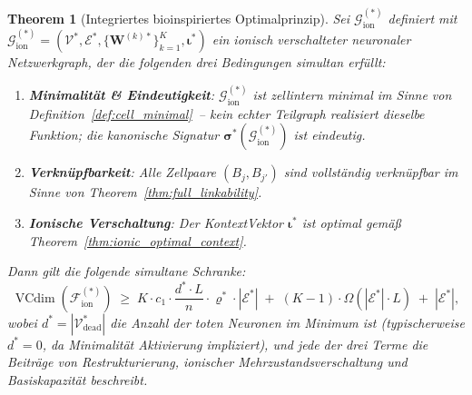 ﻿\documentclass[12pt, a4paper, openany]{report}
\newtheorem{theorem}{Theorem}[chapter]
\newcommand{\calG}{\mathcal{G}}
\newcommand{\calV}{\mathcal{V}}
\newcommand{\calE}{\mathcal{E}}
\newcommand{\calF}{\mathcal{F}}
\DeclareMathOperator{\VC}{VCdim}
\begin{document}
\begin{theorem}[Integriertes bioinspiriertes Optimalprinzip]
\label{thm:bio_master}
Sei  $\calG_{\mathrm{ion}}^{(*)}$ definiert mit $\calG_{\mathrm{ion}}^{(*)} = (\calV^*, \calE^*, \{\bm{W}^{(k)*}\}_{k=1}^K, \bm{\iota}^*)$
ein ionisch verschalteter neuronaler Netzwerkgraph, der die folgenden
drei Bedingungen simultan erfüllt:
\begin{enumerate}[label=(\Roman*)]
  \item \textbf{Minimalität \& Eindeutigkeit}: $\calG_{\mathrm{ion}}^{(*)}$ ist
    zellintern minimal im Sinne von Definition~\ref{def:cell_minimal}~--
    kein echter Teilgraph realisiert dieselbe Funktion; die kanonische
    Signatur $\bm{\sigma}^*(\calG_{\mathrm{ion}}^{(*)})$ ist eindeutig.
  \item \textbf{Verknüpfbarkeit}: Alle Zellpaare $(B_j, B_{j'})$ sind
    vollständig verknüpfbar im Sinne von Theorem~\ref{thm:full_linkability}.
  \item \textbf{Ionische Verschaltung}: Der KontextVektor $\bm{\iota}^*$ ist
    optimal gemäß Theorem~\ref{thm:ionic_optimal_context}.
\end{enumerate}
Dann gilt die folgende simultane Schranke:
\begin{equation}
  \label{eq:bio_master_eq}
  \VC(\calF_{\mathrm{ion}}^{(*)})
  \;\geq\;
  K \cdot c_1 \cdot \frac{d^* \cdot L}{n} \cdot \varrho^* \cdot |\calE^*|
  \;+\;
  (K-1) \cdot \Omega(|\calE^*| \cdot L)
  \;+\;
  |\calE^*|,
\end{equation}
wobei $d^* = |\calV^*_{\mathrm{dead}}|$ die Anzahl der toten Neuronen im
Minimum ist (typischerweise $d^* = 0$, da Minimalität Aktivierung impliziert),
und jede der drei Terme die Beiträge von Restrukturierung, ionischer
Mehrzustandsverschaltung und Basiskapazität beschreibt.
\end{theorem}
\end{document}
